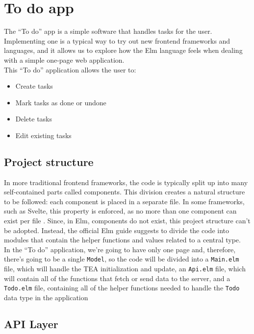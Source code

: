 \section{To do app}

The ``To do'' app is a simple software that handles tasks for the user. Implementing one is a typical way to try out new frontend frameworks and languages, and it allows us to explore how the Elm language feels when dealing with a simple one-page web application. \\
This ``To do'' application allows the user to:
\begin{itemize}
    \item Create tasks
    \item Mark tasks as done or undone
    \item Delete tasks
    \item Edit existing tasks
\end{itemize}

\subsection{Project structure}

In more traditional frontend frameworks, the code is typically split up into many self-contained parts called components. This division creates a natural structure to be followed: each component is placed in a separate file. In some frameworks, such as Svelte, this property is enforced, as no more than one component can exist per file \cite{noauthor_svelte_nodate}. Since, in Elm, components do not exist, this project structure can't be adopted. Instead, the official Elm guide suggests to divide the code into modules that contain the helper functions and values related to a central type. \cite{noauthor_structure_nodate}\\

In the ``To do'' application, we're going to have only one page and, therefore, there's going to be a single \texttt{Model}, so the code will be divided into a \texttt{Main.elm} file, which will handle the TEA initialization and update, an \texttt{Api.elm} file, which will contain all of the functions that fetch or send data to the server, and a \texttt{Todo.elm} file, containing all of the helper functions needed to handle the \texttt{Todo} data type in the application

\subsection{API Layer}

